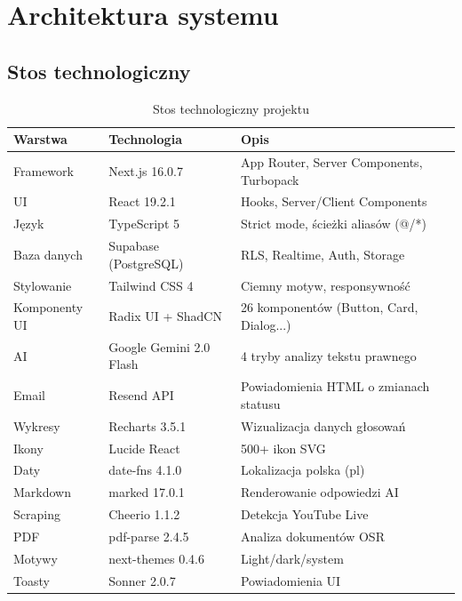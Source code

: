 \documentclass[12pt,a4paper]{article}
\begin{document}
\newpage

\section{Architektura systemu}

\subsection{Stos technologiczny}

\begin{table}[H]
\centering
\renewcommand{\arraystretch}{1.4}
\begin{tabularx}{\textwidth}{l l X}
\toprule
\textbf{Warstwa} & \textbf{Technologia} & \textbf{Opis} \\
\midrule
Framework & Next.js 16.0.7 & App Router, Server Components, Turbopack \\
UI & React 19.2.1 & Hooks, Server/Client Components \\
Język & TypeScript 5 & Strict mode, ścieżki aliasów (@/*) \\
Baza danych & Supabase (PostgreSQL) & RLS, Realtime, Auth, Storage \\
Stylowanie & Tailwind CSS 4 & Ciemny motyw, responsywność \\
Komponenty UI & Radix UI + ShadCN & 26 komponentów (Button, Card, Dialog...) \\
AI & Google Gemini 2.0 Flash & 4 tryby analizy tekstu prawnego \\
Email & Resend API & Powiadomienia HTML o zmianach statusu \\
Wykresy & Recharts 3.5.1 & Wizualizacja danych głosowań \\
Ikony & Lucide React & 500+ ikon SVG \\
Daty & date-fns 4.1.0 & Lokalizacja polska (pl) \\
Markdown & marked 17.0.1 & Renderowanie odpowiedzi AI \\
Scraping & Cheerio 1.1.2 & Detekcja YouTube Live \\
PDF & pdf-parse 2.4.5 & Analiza dokumentów OSR \\
Motywy & next-themes 0.4.6 & Light/dark/system \\
Toasty & Sonner 2.0.7 & Powiadomienia UI \\
\bottomrule
\end{tabularx}
\caption{Stos technologiczny projektu}
\label{tab:techstack}
\end{table}
\end{document}
